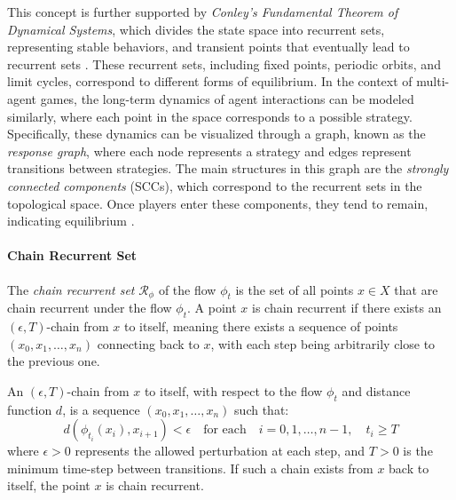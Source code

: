         \noindent
        This concept is further supported by \emph{Conley's Fundamental Theorem of Dynamical Systems}, which divides the state space into recurrent sets, representing stable behaviors, and transient points that eventually lead to recurrent sets \cite{conley1978isolated}\cite{Norton1995}. These recurrent sets, including fixed points, periodic orbits, and limit cycles, correspond to different forms of equilibrium. In the context of multi-agent games, the long-term dynamics of agent interactions can be modeled similarly, where each point in the space corresponds to a possible strategy. Specifically, these dynamics can be visualized through a graph, known as the \emph{response graph}, where each node represents a strategy and edges represent transitions between strategies. The main structures in this graph are the \emph{strongly connected components} (SCCs), which correspond to the recurrent sets in the topological space. Once players enter these components, they tend to remain, indicating equilibrium \cite{omidshafiei2019alpharank}.
        
        \paragraph{Chain Recurrent Set}

            The \emph{chain recurrent set} $\mathcal{R}_\phi$ of the flow $\phi_t$ is the set of all points $x \in X$ that are chain recurrent under the flow $\phi_t$. A point $x$ is chain recurrent if there exists an $(\epsilon, T)$-chain from $x$ to itself, meaning there exists a sequence of points $(x_0, x_1, \dots, x_n)$ connecting back to $x$, with each step being arbitrarily close to the previous one.

            \begin{definition}
                An $(\epsilon, T)$-chain from $x$ to itself, with respect to the flow $\phi_t$ and distance function $d$, is a sequence $(x_0, x_1, \dots, x_n)$ such that:
                \begin{equation}
                    d(\phi_{t_i}(x_i), x_{i+1}) < \epsilon \quad \text{for each} \quad i = 0, 1, \dots, n-1, \quad t_i \geq T
                    \nonumber
                \end{equation}
                where $\epsilon > 0$ represents the allowed perturbation at each step, and $T > 0$ is the minimum time-step between transitions. If such a chain exists from $x$ back to itself, the point $x$ is chain recurrent.
            \end{definition}


